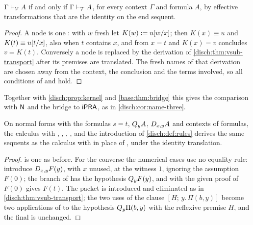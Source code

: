 \begin{theorem}
\label{disch:thm:vsub}
$\Gamma\vdash_{\mathcal V}A$ if and only if $\Gamma\vdash_{\mathcal T}A$,
for every context $\Gamma$ and formula $A$, by effective transformations
that are the identity on the end sequent.
\end{theorem}

\begin{proof}
A  node is one : with $w$ fresh let
$K(w)\mathrel{:=} u[w/x]$; then $K(x)\equiv u$ and
$K(t)\equiv u[t/x]$, also when $t$ contains $x$, and 
from $x=t$ and $K(x)=v$ concludes $v=K(t)$. Conversely a 
node is replaced by the derivation of \cref{disch:thm:vsub-transport}
after its premises are translated. The fresh names of that derivation are
chosen away from the context, the conclusion and the terms involved, so
all conditions of  and  hold.
\end{proof}

Together with \cref{disch:prop:kernel} and \cref{base:thm:bridge} this
gives the comparison with $\mathsf{N}$ and the bridge to $\mathsf{iPRA}$, as in
\cref{disch:cor:name-three}.

\begin{proposition}
\label{disch:prop:vsub-native}
On normal forms with the formulas $s=t$, $Q_{y}A$, $D_{x,y}A$ and
contexts of formulas, the calculus with , ,
, ,  and the introduction
 of \cref{disch:def:rules} derives the same sequents as
the calculus with  in place of , under the
identity translation.
\end{proposition}

\begin{proof}
 is one  as before. For the converse the
numerical cases use no equality rule: introduce $D_{x,y}F(y)$, with $x$
unused, at the witness $1$, ignoring the assumption $F(0)$; the branch of
 has the hypothesis $Q_{y}F(y)$, and  with the
given proof of $F(0)$ gives $F(t)$. The packet is introduced and
eliminated as in \cref{disch:thm:vsub-transport}; the two uses of the
clause $[H;\,y.\,\Pi(b,y)]$ become two applications of  to
the hypothesis $Q_{y}\Pi(b,y)$ with the reflexive premise $H$, and the
final  is unchanged.
\end{proof}

